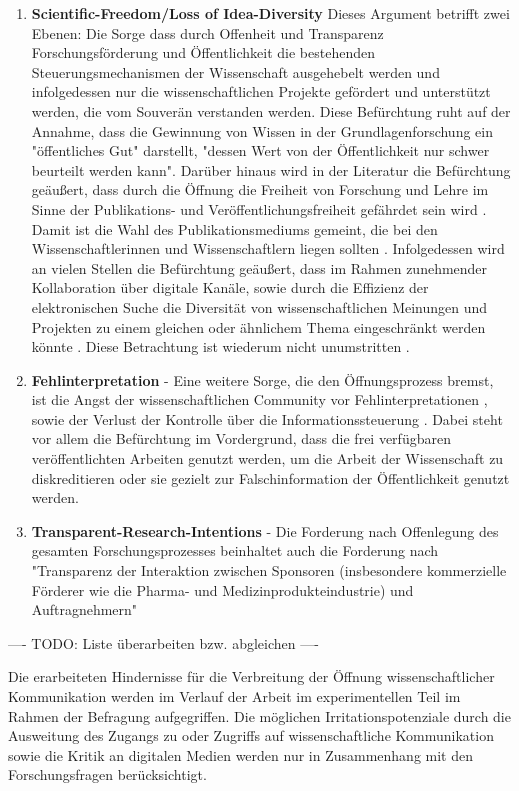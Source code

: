 \begin{enumerate}
\item \textbf{Scientific-Freedom/Loss of Idea-Diversity}
Dieses Argument betrifft zwei Ebenen: Die Sorge dass durch Offenheit und Transparenz Forschungsförderung und Öffentlichkeit die bestehenden Steuerungsmechanismen der Wissenschaft ausgehebelt werden und infolgedessen nur die wissenschaftlichen Projekte gefördert und unterstützt werden, die vom Souverän verstanden werden. Diese Befürchtung ruht auf der Annahme, dass die Gewinnung von Wissen in der Grundlagenforschung ein "öffentliches Gut" darstellt, "dessen Wert von der Öffentlichkeit nur schwer beurteilt werden kann"\cite{osterloh2008anreize}. Darüber hinaus wird in der Literatur die Befürchtung geäußert, dass durch die Öffnung die Freiheit von Forschung und Lehre im Sinne der Publikations- und Veröffentlichungsfreiheit gefährdet sein wird \cite{Jochum_2009}. Damit ist die Wahl des Publikationsmediums gemeint, die bei den Wissenschaftlerinnen und Wissenschaftlern liegen sollten \cite{bbaw_publizieren_2015} . Infolgedessen wird an vielen Stellen die Befürchtung geäußert, dass im Rahmen zunehmender Kollaboration über digitale Kanäle, sowie durch die Effizienz der elektronischen Suche die Diversität von wissenschaftlichen Meinungen und Projekten zu einem gleichen oder ähnlichem Thema eingeschränkt werden könnte \cite{Evans_2008}. Diese Betrachtung ist wiederum nicht unumstritten \cite{lariviere2009decline}.
\item \textbf{Fehlinterpretation} - Eine weitere Sorge, die den Öffnungsprozess bremst, ist die Angst der wissenschaftlichen Community vor Fehlinterpretationen \cite{grand_2012_open}, sowie der Verlust der Kontrolle über die Informationssteuerung \cite{gibbons_1994}. Dabei steht vor allem die Befürchtung im Vordergrund, dass die frei verfügbaren veröffentlichten Arbeiten genutzt werden, um die Arbeit der Wissenschaft zu diskreditieren oder sie gezielt zur Falschinformation der Öffentlichkeit genutzt werden.
\item \textbf{Transparent-Research-Intentions} - Die Forderung nach Offenlegung des gesamten Forschungsprozesses beinhaltet auch die Forderung nach "Transparenz der Interaktion zwischen Sponsoren (insbesondere kommerzielle Förderer wie die Pharma- und Medizinprodukteindustrie) und Auftragnehmern" \cite{Stengel_2013}
\end{enumerate}

---- TODO: Liste überarbeiten  bzw. abgleichen ----

Die erarbeiteten Hindernisse für die Verbreitung der Öffnung wissenschaftlicher Kommunikation werden im Verlauf der Arbeit im experimentellen Teil im Rahmen der Befragung aufgegriffen. Die möglichen Irritationspotenziale durch die Ausweitung des Zugangs zu oder Zugriffs auf wissenschaftliche Kommunikation sowie die Kritik an digitalen Medien werden nur in Zusammenhang mit den Forschungsfragen berücksichtigt.

